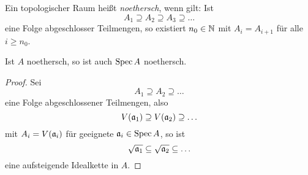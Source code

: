 \begin{definition}[noethersch]
	Ein topologischer Raum heißt \emph{noethersch}, wenn gilt:
	Ist 
	\[
		A_1 \supseteq A_2 \supseteq A_3 \supseteq\ldots
	\]
	eine Folge abgeschlosser Teilmengen, so existiert
	$n_0\in \mathbb{N}$ mit $A_i = A_{i+1}$ für alle $i\geq n_0$. 
\end{definition}

\begin{lemma}
	\label{lemma:A noethersch => Spec A noethersch}
	Ist $A$ noethersch, so ist auch $\operatorname{Spec} A$ noethersch.
\end{lemma}
\begin{proof}
	Sei 
	\[
		A_1 \supseteq A_2 \supseteq \ldots
	\]
	eine Folge abgeschlossener Teilmengen, also
	\[
		V(\mathfrak{a}_1) \supseteq V(\mathfrak{a}_2) \supseteq \ldots
	\]
	mit $A_i = V(\mathfrak{a}_i)$ für geeignete $\mathfrak{a}_i \in \operatorname{Spec} A$, so ist
	\[
		\sqrt{\mathfrak{a}_1} \subseteq \sqrt{\mathfrak{a}_2} \subseteq \ldots
	\]
	eine aufsteigende Idealkette in $A$.
\end{proof}

